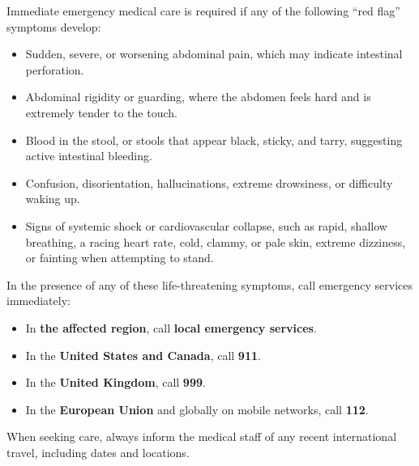 Immediate emergency medical care is required if any of the following ``red flag'' symptoms develop:
\begin{itemize}
  \item Sudden, severe, or worsening abdominal pain, which may indicate intestinal perforation.
  \item Abdominal rigidity or guarding, where the abdomen feels hard and is extremely tender to the touch.
  \item Blood in the stool, or stools that appear black, sticky, and tarry, suggesting active intestinal bleeding.
  \item Confusion, disorientation, hallucinations, extreme drowsiness, or difficulty waking up.
  \item Signs of systemic shock or cardiovascular collapse, such as rapid, shallow breathing, a racing heart rate, cold, clammy, or pale skin, extreme dizziness, or fainting when attempting to stand.
\end{itemize}

In the presence of any of these life-threatening symptoms, call emergency services immediately:
\begin{itemize}
  \item In \textbf{the affected region}, call \textbf{local emergency services}.
  \item In the \textbf{United States and Canada}, call \textbf{911}.
  \item In the \textbf{United Kingdom}, call \textbf{999}.
  \item In the \textbf{European Union} and globally on mobile networks, call \textbf{112}.
\end{itemize}
When seeking care, always inform the medical staff of any recent international travel, including dates and locations.

